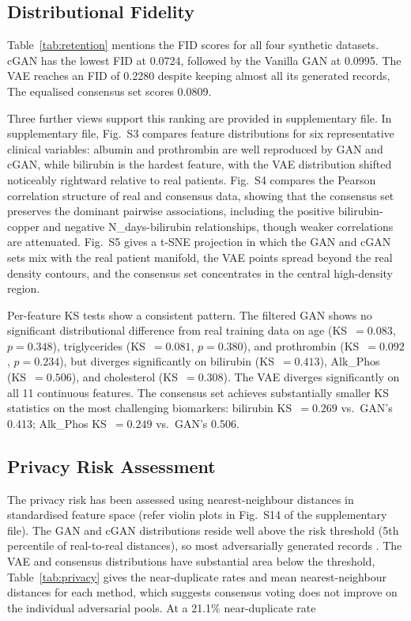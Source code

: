 \subsection{Distributional Fidelity}

Table~\ref{tab:retention} mentions the FID scores for all four synthetic datasets. cGAN has the lowest FID at 0.0724, followed by the Vanilla GAN at 0.0995. The VAE reaches an FID of 0.2280 despite keeping almost all its generated records,  The equalised consensus set scores 0.0809.

Three further views support this ranking are provided in supplementary file. In supplementary file, Fig.~S3 compares feature distributions for six representative clinical variables: albumin and prothrombin are well reproduced by GAN and cGAN, while bilirubin is the hardest feature, with the VAE distribution shifted noticeably rightward relative to real patients. Fig.~S4 compares the Pearson correlation structure of real and consensus data, showing that the consensus set preserves the dominant pairwise associations, including the positive bilirubin-copper and negative N\_days-bilirubin relationships, though weaker correlations are attenuated. Fig.~S5 gives a t-SNE projection in which the GAN and cGAN sets mix with the real patient manifold, the VAE points spread beyond the real density contours, and the consensus set concentrates in the central high-density region.

Per-feature KS tests show a consistent pattern. The filtered GAN shows no significant distributional difference from real training data on age (KS~$= 0.083$, $p = 0.348$), triglycerides (KS~$= 0.081$, $p = 0.380$), and prothrombin (KS~$= 0.092$, $p = 0.234$), but diverges significantly on bilirubin (KS~$= 0.413$), Alk\_Phos (KS~$= 0.506$), and cholesterol (KS~$= 0.308$). The VAE diverges significantly on all 11 continuous features. The consensus set achieves substantially smaller KS statistics on the most challenging biomarkers: bilirubin KS~$= 0.269$ vs.\ GAN's 0.413; Alk\_Phos KS~$= 0.249$ vs.\ GAN's 0.506.

\subsection{Privacy Risk Assessment}

The privacy risk has been assessed using nearest-neighbour distances in standardised feature space (refer violin plots in Fig.~S14 of the supplementary file). The GAN and cGAN distributions reside well above the risk threshold (5th percentile of real-to-real distances), so most adversarially generated records . The VAE and consensus distributions have substantial area below the threshold,  Table~\ref{tab:privacy} gives the near-duplicate rates and mean nearest-neighbour distances for each method, which suggests consensus voting does not improve on the individual adversarial pools. At a 21.1\% near-duplicate rate 

